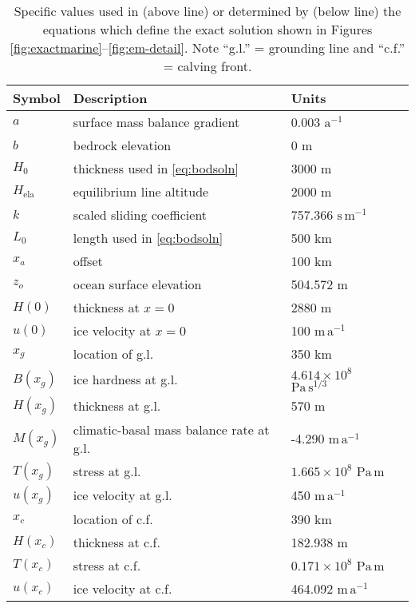 \documentclass[twocolumn,letterpaper]{igs}
\newcommand{\Hela}{H_{\text{ela}}}
\begin{document}
\begin{table}
\caption{Specific values used in (above line) or determined by (below line) the equations which define the exact solution shown in Figures \ref{fig:exactmarine}--\ref{fig:em-detail}.  Note ``g.l.'' = grounding line and ``c.f.'' = calving front.}\label{tab:exactsoln}

\medskip
\begin{tabular}{llll}
Symbol & Description & Units \\ \hline
$a$ & surface mass balance gradient & 0.003 $\text{a}^{-1}$ \\
$b$ & bedrock elevation & 0 m \\
$H_0$ & thickness used in \eqref{eq:bodsoln} & 3000 m  \\
$\Hela$ & equilibrium line altitude & 2000 m  \\
$k$ & scaled sliding coefficient & 757.366 $\text{s}\,\text{m}^{-1}$ \\
$L_0$ & length used in \eqref{eq:bodsoln} & 500 km  \\
$x_a$ & offset & 100 km  \\
$z_o$ & ocean surface elevation & 504.572 m \\
$H(0)$ & thickness at $x=0$ & 2880 m  \\
$u(0)$ & ice velocity at $x=0$ & 100 $\text{m}\,\text{a}^{-1}$  \\ \hline
$x_g$ & location of g.l. & 350 km  \\
$B(x_g)$ & ice hardness at g.l. & $4.614 \times 10^{8}$ $\text{Pa}\,\text{s}^{1/3}$  \\
$H(x_g)$ & thickness at g.l. & 570 m  \\
$M(x_g)$ & climatic-basal mass balance rate at g.l. & -4.290 $\text{m}\,\text{a}^{-1}$  \\
$T(x_g)$ & stress at g.l. & $1.665 \times 10^{8}$ $\text{Pa}\,\text{m}$  \\
$u(x_g)$ & ice velocity at g.l. & 450 $\text{m}\,\text{a}^{-1}$  \\
$x_c$ & location of c.f. & 390 km  \\
$H(x_c)$ & thickness at c.f. & 182.938 m  \\
$T(x_c)$ & stress at c.f. & $0.171 \times 10^{8}$ $\text{Pa}\,\text{m}$  \\
$u(x_c)$ & ice velocity at c.f. & 464.092 $\text{m}\,\text{a}^{-1}$  \\
\end{tabular}
\end{table}
\end{document}
